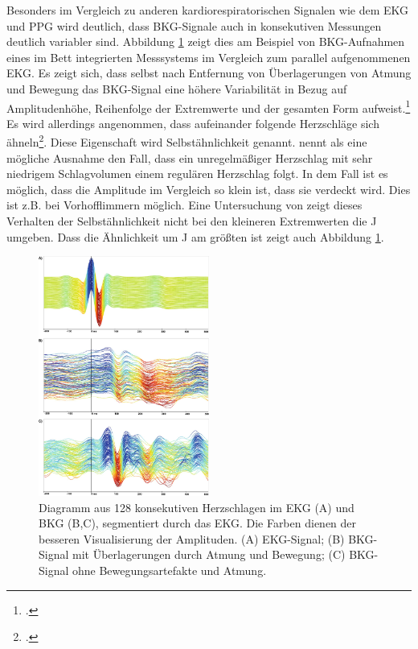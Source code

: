 	
	Besonders im Vergleich zu anderen kardiorespiratorischen Signalen wie dem \ac{EKG} und \ac{PPG} wird deutlich, dass \ac{BKG}-Signale auch in konsekutiven Messungen deutlich variabler sind. Abbildung \ref{fig:variabilitaet} zeigt dies am Beispiel von \ac{BKG}-Aufnahmen eines im Bett integrierten Messsystems im Vergleich zum parallel aufgenommenen \ac{EKG}. Es zeigt sich, dass selbst nach Entfernung von Überlagerungen von Atmung  und Bewegung das \ac{BKG}-Signal eine höhere Variabilität in Bezug auf Amplitudenhöhe, Reihenfolge der Extremwerte und der gesamten Form aufweist.\footcite[Vgl.][]{Zink2017} Es wird allerdings angenommen, dass aufeinander folgende Herzschläge sich ähneln\footcite[Vgl.][]{Bruser2013}. Diese Eigenschaft wird Selbstähnlichkeit genannt. \citeauthor{Bruser2013} nennt als eine mögliche Ausnahme den Fall, dass ein unregelmäßiger Herzschlag mit sehr niedrigem Schlagvolumen einem regulären Herzschlag folgt. In dem Fall ist es möglich, dass die Amplitude im Vergleich so klein ist, dass sie verdeckt wird. Dies ist z.B. bei Vorhofflimmern möglich. Eine Untersuchung von \citeauthor{Rosales2012} zeigt dieses Verhalten der Selbstähnlichkeit nicht bei den kleineren Extremwerten die J umgeben. Dass die Ähnlichkeit um J am größten ist zeigt auch Abbildung \ref{fig:variabilitaet}.
	
	\begin{figure}[H]
		\centering
		\includegraphics[width=0.5\textwidth]{pic/Variabilitaet.jpg}
		\caption[Visualisierung der Variabilität des \ac{BKG}-Signals]{Diagramm aus 128 konsekutiven Herzschlagen im EKG (A) und BKG (B,C), segmentiert durch das EKG. Die Farben dienen der besseren Visualisierung der Amplituden. (A) EKG-Signal; (B) BKG-Signal mit Überlagerungen durch Atmung und Bewegung; (C) \ac{BKG}-Signal ohne Bewegungsartefakte und Atmung.\protect\footnotemark}
		\label{fig:variabilitaet}
	\end{figure}
	
